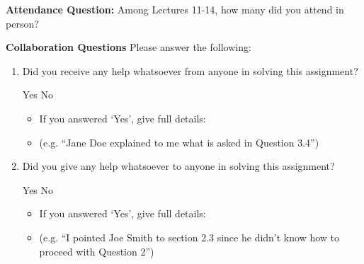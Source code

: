 \textbf{Attendance Question:} Among Lectures 11-14, how many did you attend in person?

\begin{tcolorbox}[fit,height=1cm,blank, borderline={1pt}{-2pt},nobeforeafter]
\end{tcolorbox}



\textbf{Collaboration Questions} Please answer the following:

\begin{enumerate}
    \item Did you receive any help whatsoever from anyone in solving this assignment?
          \begin{checkboxes}
              \choice Yes
              \choice No
          \end{checkboxes}
          \begin{itemize}
              \item If you answered `Yes', give full details:
              \item (e.g. “Jane Doe explained to me what is asked in Question 3.4”)
          \end{itemize}

          \begin{tcolorbox}[fit,height=3cm,blank, borderline={1pt}{-2pt},nobeforeafter]
          \end{tcolorbox}

    \item Did you give any help whatsoever to anyone in solving this assignment?
          \begin{checkboxes}
              \choice Yes
              \choice No
          \end{checkboxes}
          \begin{itemize}
              \item If you answered `Yes', give full details:
              \item (e.g. “I pointed Joe Smith to section 2.3 since he didn’t know how to proceed with Question 2”)
          \end{itemize}

          \begin{tcolorbox}[fit,height=3cm,blank, borderline={1pt}{-2pt},nobeforeafter]
          \end{tcolorbox}


\end{enumerate}
